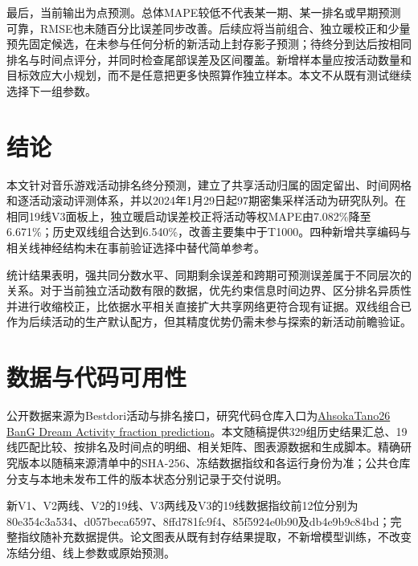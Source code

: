\documentclass[a4paper,11pt,fontset=none]{ctexart}
\begin{document}
最后，当前输出为点预测。总体MAPE较低不代表某一期、某一排名或早期预测可靠，RMSE也未随百分比误差同步改善。后续应将当前组合、独立暖校正和少量预先固定候选，在未参与任何分析的新活动上封存影子预测；待终分到达后按相同排名与时间点评分，并同时检查尾部误差及区间覆盖。新增样本量应按活动数量和目标效应大小规划，而不是任意把更多快照算作独立样本。本文不从既有测试继续选择下一组参数。

\section{结论}

本文针对音乐游戏活动排名终分预测，建立了共享活动归属的固定留出、时间网格和逐活动滚动评测体系，并以2024年1月29日起97期密集采样活动为研究队列。在相同19线V3面板上，独立暖启动误差校正将活动等权MAPE由7.082\%降至6.671\%；历史双线组合达到6.540\%，改善主要集中于T1000。四种新增共享编码与相关线神经结构未在事前验证选择中替代简单参考。

统计结果表明，强共同分数水平、同期剩余误差和跨期可预测误差属于不同层次的关系。对于当前独立活动数有限的数据，优先约束信息时间边界、区分排名异质性并进行收缩校正，比依据水平相关直接扩大共享网络更符合现有证据。双线组合已作为后续活动的生产默认配方，但其精度优势仍需未参与探索的新活动前瞻验证。

\FloatBarrier
\section*{数据与代码可用性}

公开数据来源为Bestdori活动与排名接口\citep{bestdori2026data}，研究代码仓库入口为\href{https://github.com/AhsokaTano26/BanG-DreamActivity-fraction-prediction/tree/research/innovation-20261113}{AhsokaTano26 BanG Dream Activity fraction prediction}。本文随稿提供329组历史结果汇总、19线匹配比较、按排名及时间点的明细、相关矩阵、图表源数据和生成脚本。精确研究版本以随稿来源清单中的SHA-256、冻结数据指纹和各运行身份为准；公共仓库分支与本地未发布工件的版本状态分别记录于交付说明。

新V1、V2两线、V2的19线、V3两线及V3的19线数据指纹前12位分别为80e354c3a534、d057beca6597、8ffd781fc9f4、85f5924e0b90及db4e9b9c84bd；完整指纹随补充数据提供。论文图表从既有封存结果提取，不新增模型训练，不改变冻结分组、线上参数或原始预测。




\end{document}
